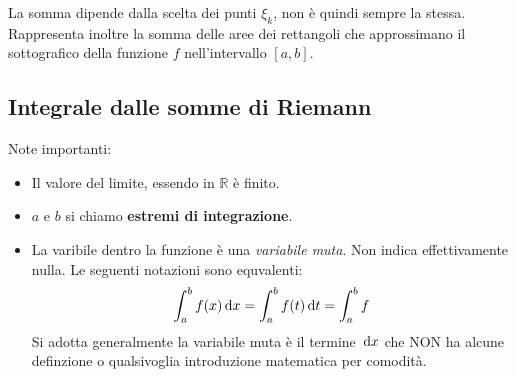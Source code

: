 La somma dipende dalla scelta dei punti $\xi_k$, non è quindi sempre la stessa. Rappresenta inoltre la somma delle aree dei rettangoli che approssimano il sottografico della funzione $f$ nell'intervallo $[a,b]$. %

\subsection{Integrale dalle somme di Riemann} %

Note importanti:
\begin{itemize}
	\item Il valore del limite, essendo in $\mathbb{R}$ è finito.
	
	\item $a$ e $b$ si chiamo \textbf{estremi di integrazione}.

	\item La varibile dentro la funzione è una \textit{variabile muta}. Non indica effettivamente nulla. Le seguenti notazioni sono equvalenti:
		\begin{equation*}
			\int_a^b f(x) \,\text{d} x = \int_a^b f(t) \,\text{d} t = \int_a^b f
		\end{equation*}
		Si adotta generalmente la variabile muta è il termine $\,\text{d} x$ che NON ha alcune definzione o qualsivoglia introduzione matematica per comodità.
\end{itemize}

